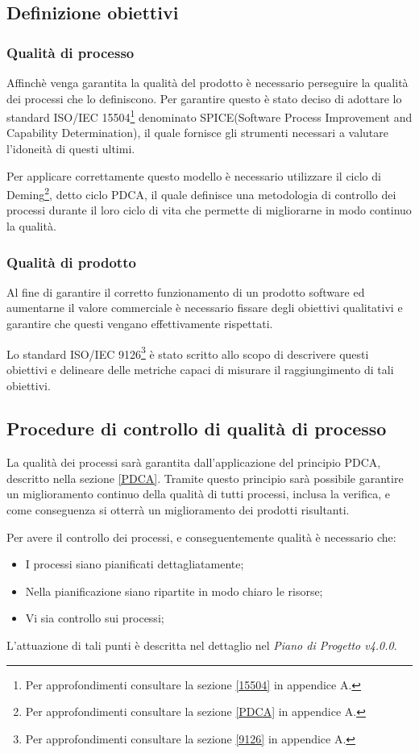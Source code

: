 \subsection{Definizione obiettivi}
\subsubsection{Qualità di processo}
Affinchè venga garantita la qualità del prodotto è necessario perseguire la qualità dei processi che lo definiscono. Per garantire questo è stato deciso di adottare lo standard ISO/IEC 15504\footnote{Per approfondimenti consultare la sezione \ref{15504} in appendice A.} denominato SPICE(Software Process Improvement and Capability Determination), il quale fornisce gli strumenti necessari a valutare l'idoneità di questi ultimi.

\noindent Per applicare correttamente questo modello è necessario utilizzare il ciclo di Deming\footnote{Per approfondimenti consultare la sezione \ref{PDCA} in appendice A.}, detto ciclo PDCA, il quale definisce una metodologia di controllo dei processi durante il loro ciclo di vita che permette di migliorarne in modo continuo la qualità.

\subsubsection{Qualità di prodotto}
Al fine di garantire il corretto funzionamento di un prodotto software ed aumentarne il valore commerciale è necessario fissare degli obiettivi qualitativi e garantire che questi vengano effettivamente rispettati.

\noindent Lo standard ISO/IEC 9126\footnote{Per approfondimenti consultare la sezione \ref{9126} in appendice A.} è stato scritto allo scopo di descrivere questi obiettivi e delineare delle metriche capaci di misurare il raggiungimento di tali obiettivi.

\subsection{Procedure di controllo di qualità di processo}
La qualità dei processi sarà garantita dall'applicazione del principio PDCA, descritto nella sezione \ref{PDCA}. Tramite questo principio sarà possibile garantire un miglioramento continuo della qualità di tutti processi, inclusa la verifica, e come conseguenza si otterrà un miglioramento dei prodotti risultanti.

\noindent Per avere il controllo dei processi, e conseguentemente qualità è necessario che:
\begin{itemize}
	\item I processi siano pianificati dettagliatamente;
	\item Nella pianificazione siano ripartite in modo chiaro le risorse;
	\item Vi sia controllo sui processi;
\end{itemize}
\noindent L'attuazione di tali punti è descritta nel dettaglio nel \textit{Piano di Progetto v4.0.0}.

